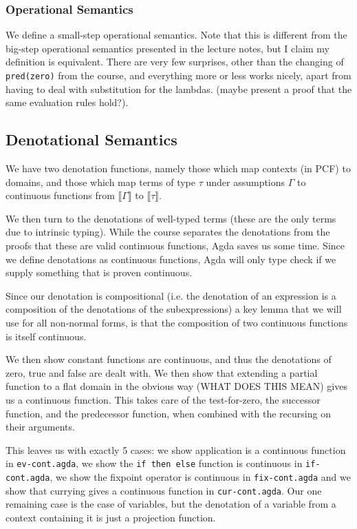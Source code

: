 \documentclass[12pt,a4paper,twoside,openright]{report}
\begin{document}
\subsubsection{Operational Semantics}
We define a small-step operational semantics. Note that this is different from the big-step operational semantics presented in the lecture notes, but I claim my definition is equivalent. There are very few surprises, other than the changing of \texttt{pred(zero)} from the course, and everything more or less works nicely, apart from having to deal with substitution for the lambdas. (maybe present a proof that the same evaluation rules hold?). 
\subsection{Denotational Semantics}
We have two denotation functions, namely those which map contexts (in PCF) to domains, and those which map terms of type $\tau$ under assumptions $\Gamma$ to continuous functions from $\llbracket \Gamma \rrbracket$ to $\llbracket \tau \rrbracket$. 

We then turn to the denotations of well-typed terms (these are the only terms due to intrinsic typing). While the course separates the denotations from the proofs that these are valid continuous functions, Agda saves us some time. Since we define denotations as continuous functions, Agda will only type check if we supply something that is proven continuous.

Since our denotation is compositional (i.e. the denotation of an expression is a composition of the denotations of the subexpressions) a key lemma that we will use for all non-normal forms, is that the composition of two continuous functions is itself continuous.

We then show constant functions are continuous, and thus the denotations of zero, true and false are dealt with. We then show that extending a partial function to a flat domain in the obvious way (WHAT DOES THIS MEAN) gives us a continuous function. This takes care of the test-for-zero, the successor function, and the predecessor function, when combined with the recursing on their arguments. 

This leaves us with exactly 5 cases: we show application is a continuous function in \texttt{ev-cont.agda}, we show the \texttt{if then else} function is continuous in \texttt{if-cont.agda}, we show the fixpoint operator is continuous in \texttt{fix-cont.agda} and we show that currying gives a continuous function in \texttt{cur-cont.agda}. Our one remaining case is the case of variables, but the denotation of a variable from a context containing it is just a projection function. 
\end{document}
